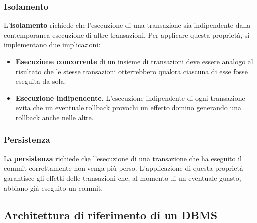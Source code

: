 \documentclass[a4paper]{article}
\begin{document}
	\subsubsection{Isolamento}
	
	L'\textcolor{Red3}{\textbf{isolamento}} richiede che l'esecuzione di una transazione sia indipendente dalla contemporanea esecuzione di altre transazioni.\newline
	Per applicare questa proprietà, si implementano due implicazioni:
	\begin{itemize}
		\item \textbf{Esecuzione concorrente} di un insieme di transazioni deve essere analogo al risultato che le stesse transazioni otterrebbero qualora ciascuna di esse fosse eseguita da sola.
		\item \textbf{Esecuzione indipendente}. L'esecuzione indipendente di ogni transazione evita che un eventuale \textsf{rollback} provochi un effetto domino generando una \textsf{rollback} anche nelle altre.
	\end{itemize}

	\subsubsection{Persistenza}
	
	La \textcolor{Red3}{\textbf{persistenza}} richiede che l'esecuzione di una transazione che ha eseguito il \textsf{commit} correttamente non venga più perso.\newline
	L'applicazione di questa proprietà garantisce gli effetti delle transazioni che, al momento di un eventuale guasto, abbiano già eseguito un \textsf{commit}.\newpage
	
	\subsection{Architettura di riferimento di un DBMS}
	
\end{document}
